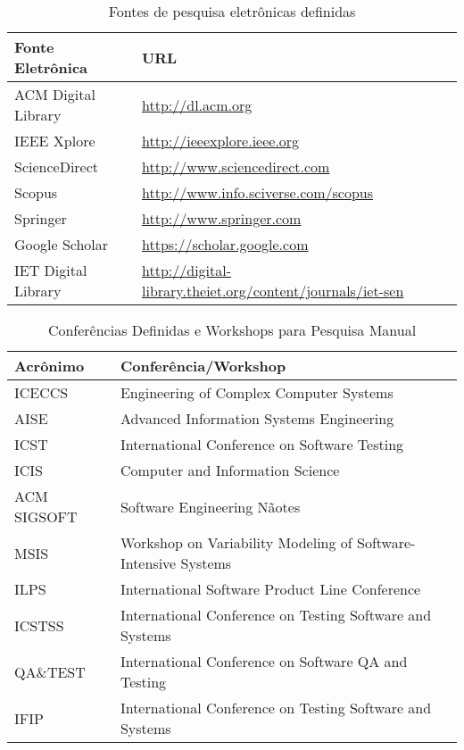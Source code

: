 \begin{table}[!ht]
	\centering
	\scriptsize
	\caption{Fontes de pesquisa eletrônicas definidas}
	\label{table:fontes}
	\begin{tabular}{l|l}
		\hline \hline
		\textbf{Fonte Eletrônica} & \textbf{URL}                               							\\\hline
		ACM Digital Library  & \url{http://dl.acm.org}                                         \\\hline
		IEEE Xplore          & \url{http://ieeexplore.ieee.org}                                \\\hline
		ScienceDirect        & \url{http://www.sciencedirect.com}                              \\\hline
		Scopus               & \url{http://www.info.sciverse.com/scopus}                       \\\hline
		Springer             & \url{http://www.springer.com}                                   \\\hline
		Google Scholar       & \url{https://scholar.google.com}                                 \\\hline
		IET  Digital Library & \url{http://digital-library.theiet.org/content/journals/iet-sen} \\\hline
		\hline
	\end{tabular}
\end{table}

\begin{table}[!ht]
	\centering
	\scriptsize
	\caption{Conferências Definidas e Workshops para Pesquisa Manual}
	\label{table:conferences}
	\begin{tabular}{l|l}
		\hline \hline
		\textbf{Acrônimo} & \textbf{Conferência/Workshop}                                 \\\hline
		ICECCS         & Engineering of Complex Computer Systems                        \\\hline
		AISE           & Advanced Information Systems Engineering                       \\\hline
		ICST           & International Conference on Software Testing                   \\\hline
		ICIS           & Computer and Information Science                               \\\hline
		ACM SIGSOFT    & Software Engineering Nãotes                                     \\\hline
		MSIS           & Workshop on Variability Modeling of Software-Intensive Systems \\\hline
		ILPS           & International Software Product Line Conference                 \\\hline
		ICSTSS         & International Conference on Testing Software and Systems       \\\hline
		QA\&TEST       & International Conference on Software QA and Testing            \\\hline
		IFIP           & International Conference on Testing Software and Systems       \\\hline
		\hline
	\end{tabular}
\end{table}


